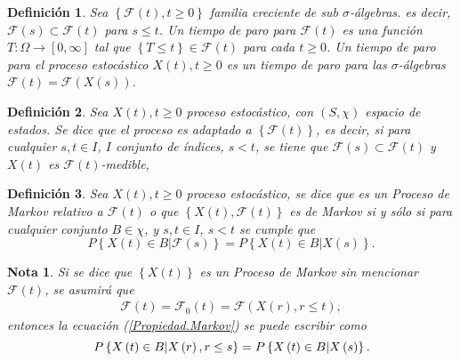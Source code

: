 \documentclass{article}
\newtheorem{Def}{Definición}[section]
\newtheorem{Note}{Nota}[section]
\numberwithin{equation}{section}
\begin{document}
\begin{Def}\label{Def.Tiempo.Paro}
Sea $\left\{\mathcal{F}\left(t\right),t\geq0\right\}$ familia creciente de sub $\sigma$-\'algebras. es decir, $\mathcal{F}\left(s\right)\subset\mathcal{F}\left(t\right)$ para $s\leq t$. Un tiempo de paro para $\mathcal{F}\left(t\right)$ es una funci\'on $T:\Omega\rightarrow\left[0,\infty\right]$ tal que $\left\{T\leq t\right\}\in\mathcal{F}\left(t\right)$ para cada $t\geq0$. Un tiempo de paro para el proceso estoc\'astico $X\left(t\right),t\geq0$ es un tiempo de paro para las $\sigma$-\'algebras $\mathcal{F}\left(t\right)=\mathcal{F}\left(X\left(s\right)\right)$.
\end{Def}

\begin{Def}
Sea $X\left(t\right),t\geq0$ proceso estoc\'astico, con $\left(S,\chi\right)$ espacio de estados. Se dice que el proceso es adaptado a $\left\{\mathcal{F}\left(t\right)\right\}$, es decir, si para cualquier $s,t\in I$, $I$ conjunto de \'indices, $s<t$, se tiene que $\mathcal{F}\left(s\right)\subset\mathcal{F}\left(t\right)$ y $X\left(t\right)$ es $\mathcal{F}\left(t\right)$-medible,
\end{Def}

\begin{Def}
Sea $X\left(t\right),t\geq0$ proceso estoc\'astico, se dice que es un Proceso de Markov relativo a $\mathcal{F}\left(t\right)$ o que $\left\{X\left(t\right),\mathcal{F}\left(t\right)\right\}$ es de Markov si y s\'olo si para cualquier conjunto $B\in\chi$,  y $s,t\in I$, $s<t$ se cumple que
\begin{equation}\label{Propiedad.Markov}
P\left\{X\left(t\right)\in B|\mathcal{F}\left(s\right)\right\}=P\left\{X\left(t\right)\in B|X\left(s\right)\right\}.
\end{equation}
\end{Def}
\begin{Note}
Si se dice que $\left\{X\left(t\right)\right\}$ es un Proceso de Markov sin mencionar $\mathcal{F}\left(t\right)$, se asumir\'a que
\begin{eqnarray}
\mathcal{F}\left(t\right)=\mathcal{F}_{0}\left(t\right)=\mathcal{F}\left(X\left(r\right),r\leq t\right),
\end{eqnarray}
entonces la ecuaci\'on (\ref{Propiedad.Markov}) se puede escribir como
\begin{equation}\label{Propiedad.Markov.Equivalente}\index{Propiedad de Markov}
P\left\{X\left(t\right)\in B|X\left(r\right),r\leq s\right\} = P\left\{X\left(t\right)\in B|X\left(s\right)\right\}.
\end{equation}
\end{Note}
\end{document}
